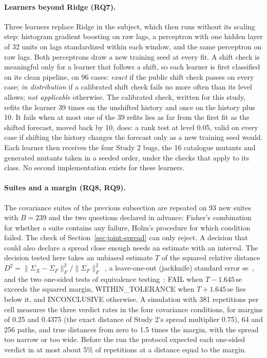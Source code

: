 \documentclass[11pt,a4paper]{article}
\begin{document}
\paragraph{Learners beyond Ridge (RQ7).}
Three learners replace Ridge in the subject, which then runs without its
scaling step: histogram gradient boosting on raw lags, a perceptron with
one hidden layer of 32 units on lags standardized within each window, and
the same perceptron on raw lags. Both perceptrons draw a new training seed
at every fit. A shift check is meaningful only for a learner that follows
a shift, so each learner is first classified on its clean pipeline, on 96
cases: \emph{exact} if the public shift check passes on every case;
\emph{in distribution} if a calibrated shift check fails no more often
than its level allows; \emph{not applicable} otherwise. The calibrated
check, written for this study, refits the learner 39 times on the
unshifted history and once on the history plus 10. It fails when at most
one of the 39 refits lies as far from the first fit as the shifted
forecast, moved back by 10, does: a rank test at level 0.05, valid on
every case if shifting the history changes the forecast only as a new
training seed would. Each learner then receives the four Study 2 bugs, the
16 catalogue mutants and \ThirdLearnerMutants{} generated mutants taken in
a seeded order, under the checks that apply to its class. No second
implementation exists for these learners.

\paragraph{Suites and a margin (RQ8, RQ9).}
The covariance suites of the previous subsection are repeated on 93 new
suites with $B=239$ and the two questions declared in advance: Fisher's
combination~\cite{fisher1932statistical} for whether a suite contains any
failure, Holm's procedure for which condition failed. The check of
Section~\ref{sec:joint-spread} can only reject. A decision that could also
declare a spread close enough needs an estimate with an interval. The
decision tested here takes an unbiased estimate $T$ of the squared
relative distance
$D^2=\|\Sigma_X-\Sigma_F\|_F^2/\|\Sigma_F\|_F^2$~\cite{cai2013optimal,chen2010tests},
a leave-one-out (jackknife) standard error
$\mathrm{se}$~\cite{efron1981jackknife,arvesen1969jackknifing}, and the
two one-sided tests of equivalence testing~\cite{schuirmann1987comparison}:
FAIL when $T-1.645\,\mathrm{se}$ exceeds the squared margin,
WITHIN\_TOLERANCE when $T+1.645\,\mathrm{se}$ lies below it, and
INCONCLUSIVE otherwise. A simulation with 381 repetitions per cell
measures the three verdict rates in the four covariance conditions, for
margins of 0.25 and 0.4375 (the exact distance of Study 2's spread
multiplier 0.75), 64 and 256 paths, and true distances from zero to 1.5
times the margin, with the spread too narrow or too wide. Before the run
the protocol expected each one-sided verdict in at most about 5\% of
repetitions at a distance equal to the margin.
\end{document}
